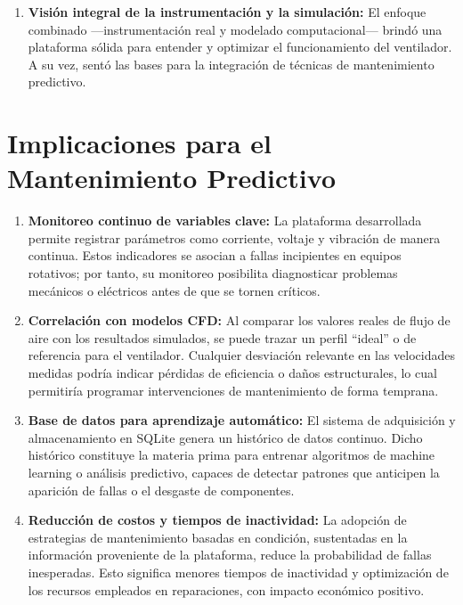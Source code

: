 \begin{enumerate}
    \item \textbf{Visión integral de la instrumentación y la simulación:}  
    El enfoque combinado —instrumentación real y modelado computacional— brindó una plataforma sólida para entender y optimizar el funcionamiento del ventilador. A su vez, sentó las bases para la integración de técnicas de mantenimiento predictivo.

\end{enumerate}

\section{Implicaciones para el Mantenimiento Predictivo}
\begin{enumerate}
    \item \textbf{Monitoreo continuo de variables clave:}  
    La plataforma desarrollada permite registrar parámetros como corriente, voltaje y vibración de manera continua. Estos indicadores se asocian a fallas incipientes en equipos rotativos; por tanto, su monitoreo posibilita diagnosticar problemas mecánicos o eléctricos antes de que se tornen críticos.

    \item \textbf{Correlación con modelos CFD:}  
    Al comparar los valores reales de flujo de aire con los resultados simulados, se puede trazar un perfil “ideal” o de referencia para el ventilador. Cualquier desviación relevante en las velocidades medidas podría indicar pérdidas de eficiencia o daños estructurales, lo cual permitiría programar intervenciones de mantenimiento de forma temprana.

    \item \textbf{Base de datos para aprendizaje automático:}  
    El sistema de adquisición y almacenamiento en SQLite genera un histórico de datos continuo. Dicho histórico constituye la materia prima para entrenar algoritmos de machine learning o análisis predictivo, capaces de detectar patrones que anticipen la aparición de fallas o el desgaste de componentes.

    \item \textbf{Reducción de costos y tiempos de inactividad:}  
    La adopción de estrategias de mantenimiento basadas en condición, sustentadas en la información proveniente de la plataforma, reduce la probabilidad de fallas inesperadas. Esto significa menores tiempos de inactividad y optimización de los recursos empleados en reparaciones, con impacto económico positivo.
\end{enumerate}

